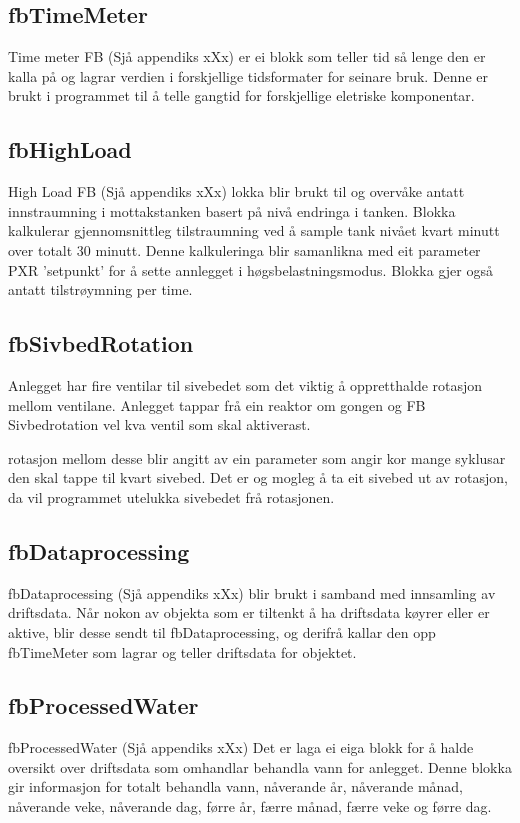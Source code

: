 \subsection{fbTimeMeter}
Time meter \gls{FB} (Sjå appendiks xXx) er ei blokk som teller tid så lenge den er kalla på og lagrar verdien i forskjellige tidsformater for seinare bruk.
Denne er brukt i programmet til å telle gangtid for forskjellige eletriske komponentar.

\subsection{fbHighLoad}
High Load \gls{FB} (Sjå appendiks xXx) lokka blir brukt til og overvåke antatt innstraumning i mottakstanken basert på nivå endringa i tanken. 
Blokka kalkulerar gjennomsnittleg tilstraumning ved å sample tank nivået kvart minutt over totalt 30 minutt.
Denne kalkuleringa blir samanlikna med eit parameter PXR 'setpunkt' for å sette annlegget i høgsbelastningsmodus.
Blokka gjer også antatt tilstrøymning per time.

\subsection{fbSivbedRotation}
Anlegget har fire ventilar til sivebedet som det viktig å oppretthalde rotasjon mellom ventilane. Anlegget tappar frå ein reaktor om gongen 
og \gls{FB} Sivbedrotation vel kva ventil som skal aktiverast.

rotasjon mellom desse blir angitt av ein parameter som angir kor mange syklusar den skal tappe til kvart sivebed. 
Det er og mogleg å ta eit sivebed ut av rotasjon, da vil programmet utelukka sivebedet frå rotasjonen.

\subsection{fbDataprocessing}
fbDataprocessing (Sjå appendiks xXx) blir brukt i samband med innsamling av driftsdata. 
Når nokon av objekta som er tiltenkt å ha driftsdata køyrer eller er aktive, blir desse sendt til fbDataprocessing, og derifrå kallar den opp fbTimeMeter som lagrar og teller driftsdata for objektet.

\subsection{fbProcessedWater}
fbProcessedWater (Sjå appendiks xXx)
Det er laga ei eiga blokk for å halde oversikt over driftsdata som omhandlar behandla vann for anlegget. 
Denne blokka gir informasjon for totalt behandla vann, nåverande år, nåverande månad, nåverande veke, nåverande dag, førre år, færre månad, færre veke og førre dag.